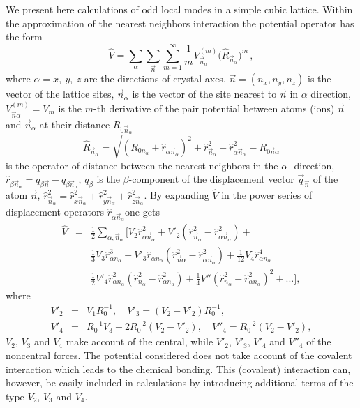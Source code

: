 We present here calculations of odd local modes in a simple cubic lattice. 
Within the approximation of the nearest neighbors interaction the potential 
operator has the form
\begin{equation}
\hat{V} = \sum_{\alpha}\sum_{\vec{n}}\sum_{m=1}^{\infty} \frac{1}{m} V^{(m)}_{
\vec{n}_{\alpha}} {\big (} \hat{R}_{\vec{n}_{\alpha}} {\big )}^{m}\,,
\end{equation}
where $\alpha = x,\:y,\:z$ are the directions of crystal axes, 
$\vec{n} = (n_{x},n_{y},n_{z})$ is the vector of the lattice sites, 
$\vec{n}_{\alpha}$ is the vector of the site nearest to $\vec{n}$ in $\alpha$ 
direction, $V^{(m)}_{\vec{n}\alpha} = V_m$ is the $m$-th derivative of the 
pair potential between atoms (ions) $\vec{n}$ and $\vec{n}_{\alpha}$ at their
distance $R_{0\vec{n}_{\alpha}}$
\begin{equation}
\hat{R}_{\vec{n}_{\alpha}} = \sqrt{(R_{0 n_{\alpha}} + \hat{r}_{\alpha 
\vec{n}_{\alpha}})^{2} + \hat{r}^{2}_{\vec{n}_{\alpha}}-
\hat{r}_{\alpha \vec{n}_{\alpha}}^{2}} - R_{0\vec{n}\alpha}
\end{equation}
is the operator of distance between the nearest neighbors in the $\alpha$-
direction, $\hat{r}_{\beta\vec{n}_\alpha}=q_{\beta\vec{n}}-q_{\beta 
\vec{n}_{\alpha}}$, $q_{\beta}$ is the $\beta$-component of the displacement 
vector $\vec{q}_{\vec{n}}$ of the atom $\vec{n}$, 
$\hat{r}_{\vec{n}_{\alpha}}^{2} = \hat{r}^{2}_{x\vec{n}_{\alpha}} +
\hat{r}^{2}_{y\vec{n}_{\alpha}} + \hat{r}^{2}_{z \vec{n}_{\alpha}}$.
By expanding $\hat{V}$ in the power series of displacement operators 
$\hat{r}_{\alpha\vec{n}_{\alpha}}$one gets
\begin{eqnarray}
\hat{V} &=& \frac{1}{2}\sum_{\alpha , \vec{n}_{\alpha}}
[V_2\hat{r}^2_{\alpha \vec{n}_{\alpha}} + 
V'_2(\hat{r}^2_{\vec{n}_{\alpha}}-\hat{r}^2_{\alpha \vec{n}_{\alpha}}) +
\nonumber\\
&&\frac{1}{3}V_3\hat{r}^3_{\alpha n_{\alpha}} + 
V'_3 \hat{r}_{\alpha n_{\alpha}}(\hat{r}^2_{\vec{n}\alpha}-
\hat{r}^2_{\alpha\vec{n}_{\alpha}})+
\frac{1}{12} V_4\hat{r}^4_{\alpha n_{\alpha}}  \nonumber \\
&&\frac{1}{2}V'_4 \hat{r}^2_{\alpha n_{\alpha}} (\hat{r}^2_{n_{\alpha}}-
\hat{r}^2_{\alpha n_{\alpha}}) +
\frac{1}{4} V'' (\hat{r}^2_{n_\alpha}-\hat{r}^2_{\alpha n_{\alpha}})^2 +...],
\end{eqnarray}
where
\begin{eqnarray}
V'_2 &=& V_1 R_0^{-1},\quad V'_3 = (V_2 - V'_2)R_0^{-1}, \nonumber \\
V'_4 &=& R_0^{-1}V_3 - 2R_0^{-2}(V_2 - V'_2),\quad
V''_4 = R_0^{-2} (V_2 - V'_2),
\end{eqnarray}
$V_{2}$, $V_{3}$ and $V_{4}$ make account of the central, while $V'_{2}$, 
$V'_{3}$, $V'_{4}$ and $V''_{4}$ of the noncentral forces. The potential 
considered does not take account of the covalent interaction which leads to 
the chemical bonding. This (covalent) interaction can, however, be easily 
included in calculations by introducing additional terms of the type $V_{2}$, 
$V_{3}$ and $V_{4}$.

